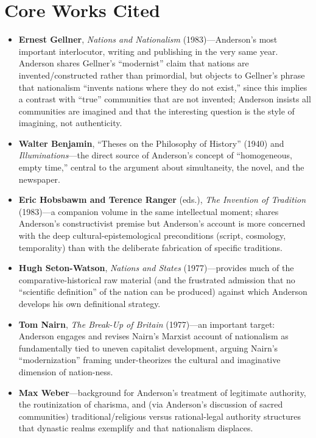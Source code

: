\documentclass[12pt]{article}
\begin{document}
\section{Core Works Cited}

\begin{itemize}[leftmargin=*, itemsep=4pt]
    \item \textbf{Ernest Gellner}, \textit{Nations and Nationalism} (1983)---Anderson's most important interlocutor, writing and publishing in the very same year. Anderson shares Gellner's ``modernist'' claim that nations are invented/constructed rather than primordial, but objects to Gellner's phrase that nationalism ``invents nations where they do not exist,'' since this implies a contrast with ``true'' communities that are not invented; Anderson insists all communities are imagined and that the interesting question is the style of imagining, not authenticity.
    \item \textbf{Walter Benjamin}, ``Theses on the Philosophy of History'' (1940) and \textit{Illuminations}---the direct source of Anderson's concept of ``homogeneous, empty time,'' central to the argument about simultaneity, the novel, and the newspaper.
    \item \textbf{Eric Hobsbawm and Terence Ranger} (eds.), \textit{The Invention of Tradition} (1983)---a companion volume in the same intellectual moment; shares Anderson's constructivist premise but Anderson's account is more concerned with the deep cultural-epistemological preconditions (script, cosmology, temporality) than with the deliberate fabrication of specific traditions.
    \item \textbf{Hugh Seton-Watson}, \textit{Nations and States} (1977)---provides much of the comparative-historical raw material (and the frustrated admission that no ``scientific definition'' of the nation can be produced) against which Anderson develops his own definitional strategy.
    \item \textbf{Tom Nairn}, \textit{The Break-Up of Britain} (1977)---an important target: Anderson engages and revises Nairn's Marxist account of nationalism as fundamentally tied to uneven capitalist development, arguing Nairn's ``modernization'' framing under-theorizes the cultural and imaginative dimension of nation-ness.
    \item \textbf{Max Weber}---background for Anderson's treatment of legitimate authority, the routinization of charisma, and (via Anderson's discussion of sacred communities) traditional/religious versus rational-legal authority structures that dynastic realms exemplify and that nationalism displaces.

\end{itemize}
\end{document}
